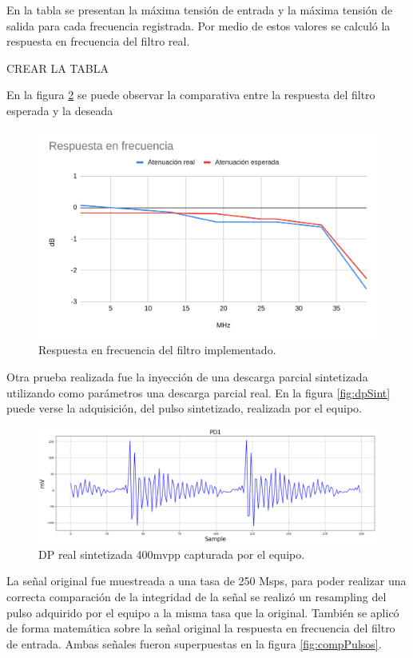 En la tabla se presentan la máxima tensión de entrada y la máxima tensión de salida para cada frecuencia registrada. Por medio de estos valores se calculó la respuesta en frecuencia del filtro real. 


CREAR LA TABLA

En la figura \ref{fig:respFrecReal} se puede observar la comparativa entre la respuesta del filtro esperada y la deseada

\begin{figure}[ht]
	\centering
	\includegraphics[width=130mm]{./Figures/respFrecReal.png}
	\caption{Respuesta en frecuencia del filtro implementado.}
	\label{fig:respFrecReal}
\end{figure}

Otra prueba realizada fue la inyección de una descarga parcial sintetizada utilizando como parámetros una descarga parcial real. En la figura \ref{fig:dpSint} puede verse la adquisición, del pulso sintetizado, realizada por el equipo.

\begin{figure}[ht]
	\centering
	\includegraphics[width=130mm]{./Figures/dpSint.png}
	\caption{DP real sintetizada 400mvpp capturada por el equipo.}
	\label{fig:respFrecReal}
\end{figure}

La señal original fue muestreada a una tasa de 250 Msps, para poder realizar una correcta comparación de la integridad de la señal se realizó un resampling del pulso adquirido por el equipo a la misma tasa que la original. También se aplicó de forma matemática sobre la señal original la respuesta en frecuencia del filtro de entrada. Ambas señales fueron superpuestas en la figura \ref{fig:compPulsos}.

